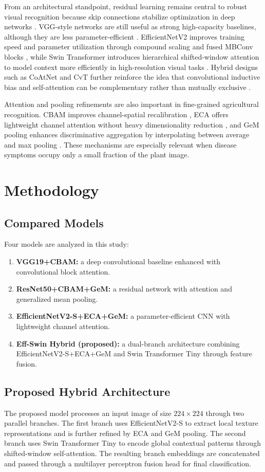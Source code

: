 \documentclass[conference]{IEEEtran}
\begin{document}
From an architectural standpoint, residual learning remains central to robust visual recognition because skip connections stabilize optimization in deep networks \cite{resnet2016}. VGG-style networks are still useful as strong high-capacity baselines, although they are less parameter-efficient \cite{vgg2015}. EfficientNetV2 improves training speed and parameter utilization through compound scaling and fused MBConv blocks \cite{effnetv22021}, while Swin Transformer introduces hierarchical shifted-window attention to model context more efficiently in high-resolution visual tasks \cite{swin2021}. Hybrid designs such as CoAtNet and CvT further reinforce the idea that convolutional inductive bias and self-attention can be complementary rather than mutually exclusive \cite{coatnet2021,cvt2021}.

Attention and pooling refinements are also important in fine-grained agricultural recognition. CBAM improves channel-spatial recalibration \cite{cbam2018}, ECA offers lightweight channel attention without heavy dimensionality reduction \cite{eca2020}, and GeM pooling enhances discriminative aggregation by interpolating between average and max pooling \cite{gem2019}. These mechanisms are especially relevant when disease symptoms occupy only a small fraction of the plant image.

\section{Methodology}
\subsection{Compared Models}
Four models are analyzed in this study:
\begin{enumerate}
    \item \textbf{VGG19+CBAM:} a deep convolutional baseline enhanced with convolutional block attention.
    \item \textbf{ResNet50+CBAM+GeM:} a residual network with attention and generalized mean pooling.
    \item \textbf{EfficientNetV2-S+ECA+GeM:} a parameter-efficient CNN with lightweight channel attention.
    \item \textbf{Eff-Swin Hybrid (proposed):} a dual-branch architecture combining EfficientNetV2-S+ECA+GeM and Swin Transformer Tiny through feature fusion.
\end{enumerate}

\subsection{Proposed Hybrid Architecture}
The proposed model processes an input image of size $224 \times 224$ through two parallel branches. The first branch uses EfficientNetV2-S to extract local texture representations and is further refined by ECA and GeM pooling. The second branch uses Swin Transformer Tiny to encode global contextual patterns through shifted-window self-attention. The resulting branch embeddings are concatenated and passed through a multilayer perceptron fusion head for final classification.
\end{document}

